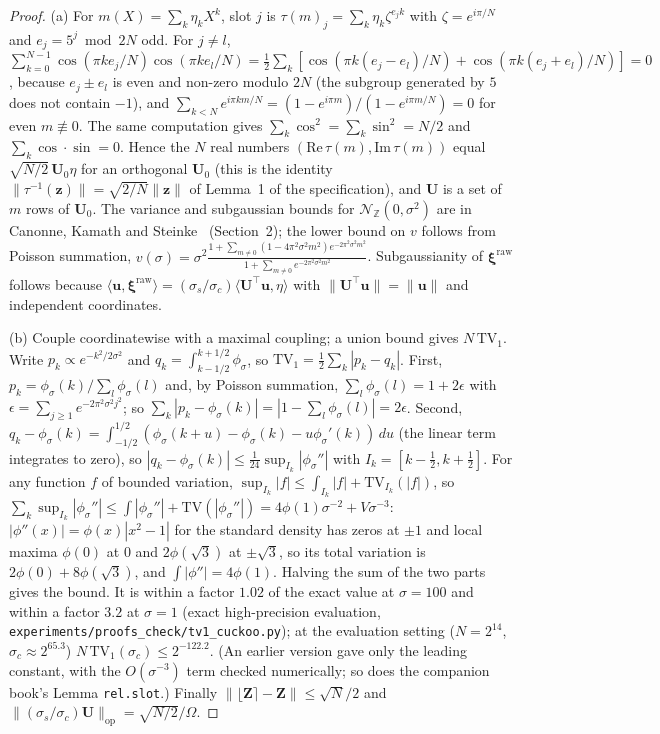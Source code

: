 \documentclass[11pt]{article}
\theoremstyle{definition}
\theoremstyle{plain}
\newcommand{\Z}{\mathbb{Z}}
\newcommand{\DG}{\mathcal{N}_{\Z}}
\newcommand{\bU}{\mathbf{U}}
\newcommand{\bu}{\mathbf{u}}
\newcommand{\bxi}{\boldsymbol{\xi}}
\newcommand{\bZ}{\mathbf{Z}}
\newcommand{\op}{\mathrm{op}}
\begin{document}
\begin{proof}
(a) For $m(X)=\sum_k\eta_kX^k$, slot $j$ is $\tau(m)_j=\sum_k\eta_k\zeta^{e_jk}$ with $\zeta=e^{i\pi/N}$ and $e_j=5^j\bmod 2N$ odd. For $j\ne l$, $\sum_{k=0}^{N-1}\cos(\pi ke_j/N)\cos(\pi ke_l/N)=\tfrac12\sum_k[\cos(\pi k(e_j-e_l)/N)+\cos(\pi k(e_j+e_l)/N)]=0$, because $e_j\pm e_l$ is even and non-zero modulo $2N$ (the subgroup generated by $5$ does not contain $-1$), and $\sum_{k<N}e^{i\pi km/N}=(1-e^{i\pi m})/(1-e^{i\pi m/N})=0$ for even $m\not\equiv0$. The same computation gives $\sum_k\cos^2=\sum_k\sin^2=N/2$ and $\sum_k\cos\cdot\sin=0$. Hence the $N$ real numbers $(\mathrm{Re}\,\tau(m),\mathrm{Im}\,\tau(m))$ equal $\sqrt{N/2}\,\bU_0\eta$ for an orthogonal $\bU_0$ (this is the identity $\|\tau^{-1}(\mathbf z)\|=\sqrt{2/N}\|\mathbf z\|$ of Lemma~1 of the specification), and $\bU$ is a set of $m$ rows of $\bU_0$. The variance and subgaussian bounds for $\DG(0,\sigma^2)$ are in Canonne, Kamath and Steinke~\cite{CKS20} (Section~2); the lower bound on $v$ follows from Poisson summation, $v(\sigma)=\sigma^2\frac{1+\sum_{m\ne0}(1-4\pi^2\sigma^2m^2)e^{-2\pi^2\sigma^2m^2}}{1+\sum_{m\ne0}e^{-2\pi^2\sigma^2m^2}}$. Subgaussianity of $\bxi^{\mathrm{raw}}$ follows because $\langle\bu,\bxi^{\mathrm{raw}}\rangle=(\sigma_s/\sigma_c)\langle\bU^\top\bu,\eta\rangle$ with $\|\bU^\top\bu\|=\|\bu\|$ and independent coordinates.

(b) Couple coordinatewise with a maximal coupling; a union bound gives $N\,\mathrm{TV}_1$. Write $p_k\propto e^{-k^2/2\sigma^2}$ and $q_k=\int_{k-1/2}^{k+1/2}\phi_\sigma$, so $\mathrm{TV}_1=\tfrac12\sum_k|p_k-q_k|$. First, $p_k=\phi_\sigma(k)/\sum_l\phi_\sigma(l)$ and, by Poisson summation, $\sum_l\phi_\sigma(l)=1+2\epsilon$ with $\epsilon=\sum_{j\ge1}e^{-2\pi^2\sigma^2j^2}$; so $\sum_k|p_k-\phi_\sigma(k)|=|1-\sum_l\phi_\sigma(l)|=2\epsilon$. Second, $q_k-\phi_\sigma(k)=\int_{-1/2}^{1/2}(\phi_\sigma(k+u)-\phi_\sigma(k)-u\phi_\sigma'(k))\,du$ (the linear term integrates to zero), so $|q_k-\phi_\sigma(k)|\le\tfrac1{24}\sup_{I_k}|\phi_\sigma''|$ with $I_k=[k-\tfrac12,k+\tfrac12]$. For any function $f$ of bounded variation, $\sup_{I_k}|f|\le\int_{I_k}|f|+\mathrm{TV}_{I_k}(|f|)$, so $\sum_k\sup_{I_k}|\phi_\sigma''|\le\int|\phi_\sigma''|+\mathrm{TV}(|\phi_\sigma''|)=4\phi(1)\sigma^{-2}+V\sigma^{-3}$: $|\phi''(x)|=\phi(x)|x^2-1|$ for the standard density has zeros at $\pm1$ and local maxima $\phi(0)$ at $0$ and $2\phi(\sqrt3)$ at $\pm\sqrt3$, so its total variation is $2\phi(0)+8\phi(\sqrt3)$, and $\int|\phi''|=4\phi(1)$. Halving the sum of the two parts gives the bound. It is within a factor $1.02$ of the exact value at $\sigma=100$ and within a factor $3.2$ at $\sigma=1$ (exact high-precision evaluation, \texttt{experiments/proofs\_check/tv1\_cuckoo.py}); at the evaluation setting ($N=2^{14}$, $\sigma_c\approx2^{65.3}$) $N\,\mathrm{TV}_1(\sigma_c)\le2^{-122.2}$. (An earlier version gave only the leading constant, with the $O(\sigma^{-3})$ term checked numerically; so does the companion book's Lemma \texttt{rel.slot}.) Finally $\|\lfloor\bZ\rceil-\bZ\|\le\sqrt N/2$ and $\|(\sigma_s/\sigma_c)\bU\|_\op=\sqrt{N/2}/\Omega$.


\end{proof}
\end{document}
